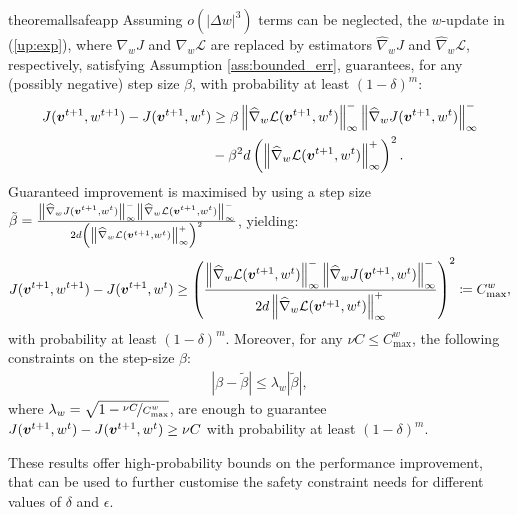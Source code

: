 \begin{restatable}[]{theorem}{allsafeapp}\label{th:safe_expapp}
	Assuming $o(|\Delta w|^3)$ terms can be neglected, the $w$-update in (\ref{up:exp}), where $\nabla_wJ$ and $\nabla_w\mathcal{L}$ are replaced by estimators $\widehat{\nabla}_wJ$ and $\widehat{\nabla}_w\mathcal{L}$, respectively, satisfying Assumption \ref{ass:bounded_err}, guarantees, for any (possibly negative) step size $\beta$, with probability at least $(1-\delta)^m$:
	\begin{align*}
	J(\vv^{t+1},w^{t+1}) - J(\vv^{t+1},w^t) 
	&\geq \beta\norm[\infty]{\widehat{\nabla}_w\mathcal{L}(\vv^{t+1},w^t)}^
	-\norm[\infty]{\widehat{\nabla}_wJ(\vv^{t+1},w^t)}^-\\
	&-
	\beta^2 d \left(\norm[\infty]{\widehat{\nabla}_w\mathcal{L}(\vv^{t+1},w^t)}^+\right)^2.
	\end{align*}
	Guaranteed improvement is maximised by using a step size\\ $\tilde{\beta} =\frac{\norm[\infty]{\widehat{\nabla}_wJ(\vv^{t+1},w^t)}^-\norm[\infty]{\widehat{\nabla}_w\mathcal{L}(\vv^{t+1},w^t)}^-}{2d\left(\norm[\infty]{\widehat{\nabla}_w\mathcal{L}(\vv^{t+1},w^t)}^+\right)^2}$, yielding:
	\begin{align*}
	J(\vv^{t+1},w^{t+1}) - J(\vv^{t+1}, w^t) \geq 
	\left(\frac{\norm[\infty]{\widehat{\nabla}_w\mathcal{L}(\vv^{t+1},w^t)}^
		-\norm[\infty]{\widehat{\nabla}_wJ(\vv^{t+1},w^t)}^-}
	{2d\norm[\infty]{\widehat{\nabla}_w\mathcal{L}(\vv^{t+1},w^t)}^+}\right)^2
	\coloneqq C_{\text{max}}^w,
	\end{align*}
	with probability at least $(1-\delta)^m$. Moreover, for any $\nu C\leq C_{\text{max}}^{w}$, the following constraints on the step-size $\beta$:
	\begin{align}
	|\beta - \tilde{\beta}| \leq \lambda_{w}|\tilde{\beta}|,
	\end{align}
	where $\lambda_{w}=\sqrt{1 - \nicefrac{\nu C}{C_{\text{max}}^{w}}}$, are enough to guarantee $J(\vv^{t+1},w^t) - J(\vv^{t+1},w^t)\geq \nu C$ with probability at least $(1-\delta)^m$.
\end{restatable}

These results offer high-probability bounds on the performance improvement, that can be used to further customise the safety constraint needs for different values of $\delta$ and $\epsilon$.